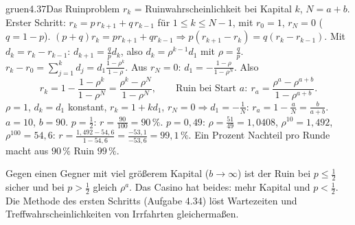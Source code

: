 \begin{loesungkarte}{gruen}{4.37}{Das Ruinproblem}
$r_k$ = Ruinwahrscheinlichkeit bei Kapital $k$, $N = a + b$. Erster Schritt: $r_k = p\,r_{k+1} + q\,r_{k-1}$ für $1\le k\le N - 1$, mit $r_0 = 1$, $r_N = 0$ ($q = 1 - p$).
$(p + q)r_k = pr_{k+1} + qr_{k-1}\Rightarrow p(r_{k+1} - r_k) = q(r_k - r_{k-1})$. Mit $d_k = r_k - r_{k-1}$: $d_{k+1} = \frac qpd_k$, also $d_k = \rho^{k-1}d_1$ mit $\rho = \frac qp$.
$r_k - r_0 = \sum_{j=1}^{k}d_j = d_1\frac{1 - \rho^{k}}{1 - \rho}$. Aus $r_N = 0$: $d_1 = -\frac{1 - \rho}{1 - \rho^{N}}$. Also
\[ r_k = 1 - \frac{1 - \rho^{k}}{1 - \rho^{N}} = \frac{\rho^{k} - \rho^{N}}{1 - \rho^{N}},\qquad\text{Ruin bei Start } a\colon\ r_a = \frac{\rho^{a} - \rho^{a+b}}{1 - \rho^{a+b}}. \]
$\rho = 1$, $d_k = d_1$ konstant, $r_k = 1 + kd_1$, $r_N = 0\Rightarrow d_1 = -\frac1N$: $r_a = 1 - \frac aN = \frac b{a + b}$.
$a = 10$, $b = 90$. $p = \frac12$: $r = \frac{90}{100} = 90\,\%$. $p = 0{,}49$: $\rho = \frac{51}{49} = 1{,}0408$, $\rho^{10} = 1{,}492$, $\rho^{100} = 54{,}6$: $r = \frac{1{,}492 - 54{,}6}{1 - 54{,}6} = \frac{-53{,}1}{-53{,}6} = 99{,}1\,\%$. Ein Prozent Nachteil pro Runde macht aus $90\,\%$ Ruin $99\,\%$.
\begin{mitnehmen}\kastentext
Gegen einen Gegner mit viel größerem Kapital ($b\to\infty$) ist der Ruin bei $p\le\frac12$ sicher und bei $p > \frac12$ gleich $\rho^{a}$. Das Casino hat beides: mehr Kapital und $p < \frac12$. Die Methode des ersten Schritts (Aufgabe 4.34) löst Wartezeiten und Treffwahrscheinlichkeiten von Irrfahrten gleichermaßen.
\end{mitnehmen}
\end{loesungkarte}

